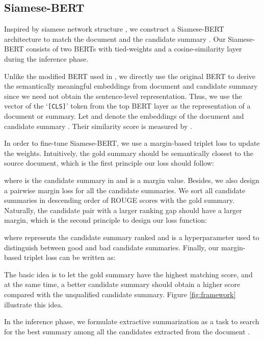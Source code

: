 \documentclass[11pt,a4paper]{article}
\begin{document}
\subsection{Siamese-BERT}




Inspired by siamese network structure \cite{bromley1994signature}, we construct a Siamese-BERT architecture to match the document  and the candidate summary . Our Siamese-BERT consists of two BERTs with tied-weights and a cosine-similarity layer during the inference phase.

Unlike the modified BERT used in \cite{liu2019fine,bae2019summary}, we directly use the original BERT to derive the semantically meaningful embeddings from document  and candidate summary  since we need not obtain the sentence-level representation.
Thus, we use the vector of the `\texttt{[CLS]}' token from the top BERT layer as the representation of a document or summary.
Let  and  denote the embeddings of the document  and candidate summary . Their similarity score is measured by .

In order to fine-tune Siamese-BERT, we use a margin-based triplet loss to update the weights.
Intuitively, the gold summary  should be semantically closest to the source document, which is the first principle our loss should follow:

where  is the candidate summary in  and  is a margin value. Besides, we also design a pairwise margin loss for all the candidate summaries. We sort all candidate summaries in descending order of ROUGE scores with the gold summary. Naturally, the candidate pair with a larger ranking gap should have a larger margin, which is the second principle to design our loss function:

where  represents the candidate summary ranked  and  is a hyperparameter used to distinguish between good and bad candidate summaries. Finally, our margin-based triplet loss can be written as:

The basic idea is to let the gold summary have the highest matching score, and at the same time,  a better candidate summary should obtain a higher score compared with the unqualified candidate summary. Figure \ref{fig:framework} illustrate this idea.




In the inference phase, we formulate extractive summarization as a task to search for the best summary among all the candidates  extracted from the document .
\end{document}
